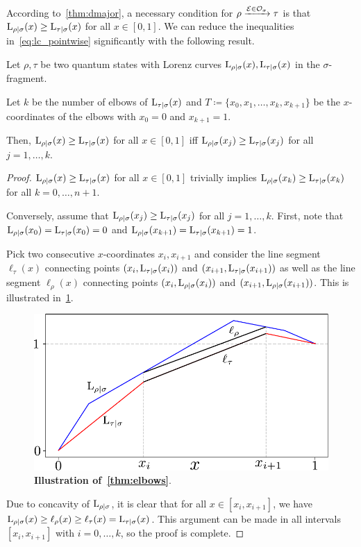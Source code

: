 \documentclass[pra,
aps,
twocolumn,
superscriptaddress,
groupedaddress,
nofootinbib,
reprint
]{revtex4-1}
\begin{document}
According to~\cref{thm:dmajor}, a necessary condition for $\rho \xrightarrow{\mathcal{E} \in \mathcal{O}_\sigma} \tau$ is that ${{\rm{L}}_{\rho|\sigma}}(x) \geq {{\rm{L}}_{\tau|\sigma}}(x)$ for all $x \in [0,1]$.
We can reduce the inequalities in~\cref{eq:lc_pointwise} significantly with the following result.
\begin{theorem}\label{thm:elbows}
	Let $\rho, \tau$ be two quantum states with Lorenz curves ${{\rm{L}}_{\rho|\sigma}}(x), {{\rm{L}}_{\tau|\sigma}}(x)$ in the $\sigma$-fragment.
	
	Let $k$ be the number of elbows of ${{\rm{L}}_{\tau|\sigma}}(x)$ and $T \coloneqq \{x_0, x_1, \dots, x_k, x_{k+1} \}$ be the $x$-coordinates of the elbows with $x_0 = 0$ and $x_{k+1} = 1$.
	
	Then, ${{\rm{L}}_{\rho|\sigma}}(x) \geq {{\rm{L}}_{\tau|\sigma}}(x)$ for all $x \in [0,1]$ iff ${{\rm{L}}_{\rho|\sigma}}(x_j) \geq {{\rm{L}}_{\tau|\sigma}}(x_j)$ for all $j =1,\dots,k$.
\end{theorem}
\begin{proof}	
	${{\rm{L}}_{\rho|\sigma}}(x) \geq {{\rm{L}}_{\tau|\sigma}}(x)$ for all $x \in [0,1]$ trivially implies ${{\rm{L}}_{\rho|\sigma}}(x_k) \geq {{\rm{L}}_{\tau|\sigma}}(x_k)$ for all $k =0,\dots,n+1$.
	
	Conversely, assume that ${{\rm{L}}_{\rho|\sigma}}(x_j) \geq {{\rm{L}}_{\tau|\sigma}}(x_j)$ for all $j =1,\dots,k$.
	First, note that ${{\rm{L}}_{\rho|\sigma}}(x_0) = {{\rm{L}}_{\tau|\sigma}}(x_0) = 0$ and ${{\rm{L}}_{\rho|\sigma}}(x_{k+1}) = {{\rm{L}}_{\tau|\sigma}}(x_{k+1}) = 1$.
	
	Pick two consecutive $x$-coordinates $x_i, x_{i+1}$ and consider the line segment $\ell_\tau(x)$ connecting points $(x_i, {{\rm{L}}_{\tau|\sigma}}(x_i))$ and $(x_{i+1}, {{\rm{L}}_{\tau|\sigma}}(x_{i+1}))$ as well as the line segment $\ell_\rho(x)$ connecting points $(x_i, {{\rm{L}}_{\rho|\sigma}}(x_i))$ and $(x_{i+1}, {{\rm{L}}_{\rho|\sigma}}(x_{i+1}))$.
	This is illustrated in~\cref{fig:elbows_proof}.
\begin{figure}[h]
    \centering
    \includegraphics[scale=0.6]{figs/elbows_proof.pdf}
    \caption{\textbf{Illustration of~\cref{thm:elbows}}.
    }
    \label{fig:elbows_proof}
\end{figure}

	Due to concavity of ${{\rm{L}}_{\rho|\sigma}}$, it is clear that for all $x \in [x_i, x_{i+1}]$, we have ${{\rm{L}}_{\rho|\sigma}}(x) \geq \ell_\rho(x) \geq \ell_\tau(x) = {{\rm{L}}_{\tau|\sigma}}(x)$.
	This argument can be made in all intervals $[x_i, x_{i+1}]$ with $i=0,\dots,k$, so the proof is complete.
\end{proof}
\end{document}
